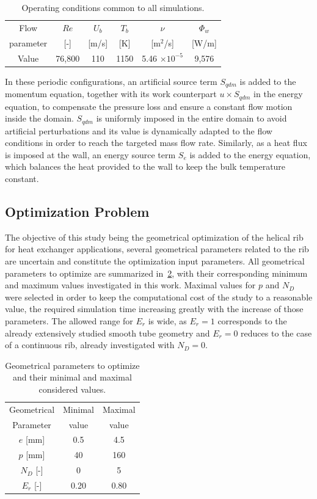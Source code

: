 \begin{table}
\small
\centering
\begin{tabular}{c|c|c|c|c|c}
  Flow & $Re$ & $U_b$ & $T_b$ & $\nu$ & $\Phi_w$    \\
  parameter & [-]  & [m/s] & [K]   & [m$^2$/s] & [W/m] \\
  \hline
  Value & 76,800 & 110 & 1150 & 5.46 $\times 10^{-5}$ & 9,576 \\
\end{tabular}
\caption{Operating conditions common to all simulations.}
\label{tab_opconditions}
\end{table}

In these periodic configurations, an artificial source term $S_{qdm}$ is added to the momentum equation, together with its work counterpart $u \times S_{qdm}$ in the energy equation, to compensate the pressure loss and ensure a constant flow motion inside the domain. $S_{qdm}$ is uniformly imposed in the entire domain to avoid artificial perturbations and its value is dynamically adapted to the flow conditions in order to reach the targeted mass flow rate. Similarly, as a heat flux is imposed at the wall, an energy source term $S_e$ is added to the energy equation, which balances the heat provided to the wall to keep the bulk temperature constant.

\subsection{Optimization Problem}

The objective of this study being the geometrical optimization of the helical rib for heat exchanger applications, several geometrical parameters related to the rib are uncertain and constitute the optimization input parameters. All geometrical parameters to optimize are summarized in~\cref{tab_parameters}, with their corresponding minimum and maximum values investigated in this work. Maximal values for $p$ and $N_D$ were selected in order to keep the computational cost of the study to a reasonable value, the required simulation time increasing greatly with the increase of those parameters. The allowed range for $E_r$ is wide, as $E_r = 1$ corresponds to the already extensively studied smooth tube geometry and $E_r = 0$ reduces to the case of a continuous rib, already investigated with $N_D = 0$.

\begin{table}
\small
\centering
\begin{tabular}{c|c|c}
  Geometrical & Minimal & Maximal \\
  Parameter & value & value \\
  \hline
  $e$ [mm] & 0.5 & 4.5 \\
  $p$ [mm] & 40 & 160 \\
  $N_D$ [-] & 0 & 5 \\
  $E_r$ [-] & 0.20 & 0.80 \\
\end{tabular}
\caption{Geometrical parameters to optimize and their minimal and maximal considered values.}
\label{tab_parameters}
\end{table}


